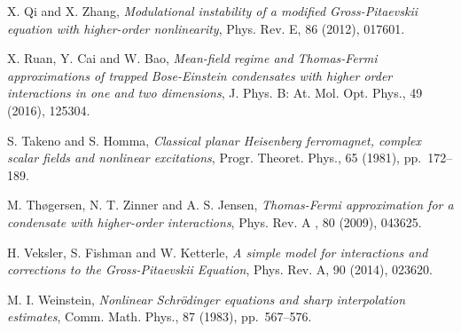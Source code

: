 \documentclass{elsarticle}
\begin{document}
\begin{thebibliography}{}
{\sc X. Qi and X. Zhang},
\textit{Modulational instability of a modified Gross-Pitaevskii equation with higher-order nonlinearity},
Phys. Rev. E, 86 (2012), 017601.

{\sc X. Ruan, Y. Cai and W. Bao},
\textit{Mean-field regime and Thomas-Fermi approximations of trapped Bose-Einstein condensates with higher order interactions in one and two dimensions},
J. Phys. B: At. Mol. Opt. Phys., 49 (2016), 125304.

{\sc S. Takeno and S. Homma},
\textit{Classical planar Heisenberg ferromagnet, complex scalar fields and nonlinear
excitations}, Progr. Theoret. Phys., 65 (1981), pp.~172--189.

{\sc M. Th{\o}gersen, N. T. Zinner and A. S. Jensen},
\textit{Thomas-Fermi approximation for a condensate with higher-order interactions},
Phys. Rev. A , 80 (2009), 043625.


{\sc H. Veksler, S. Fishman and W. Ketterle},
\textit{A simple model for interactions and corrections to the Gross-Pitaevskii Equation},
Phys. Rev. A, 90 (2014), 023620.


{\sc M. I. Weinstein}, \textit{Nonlinear Schr\"{o}dinger equations and sharp interpolation estimates}, Comm.
Math. Phys., 87 (1983), pp.~567--576.



\end{thebibliography}
\end{document}
